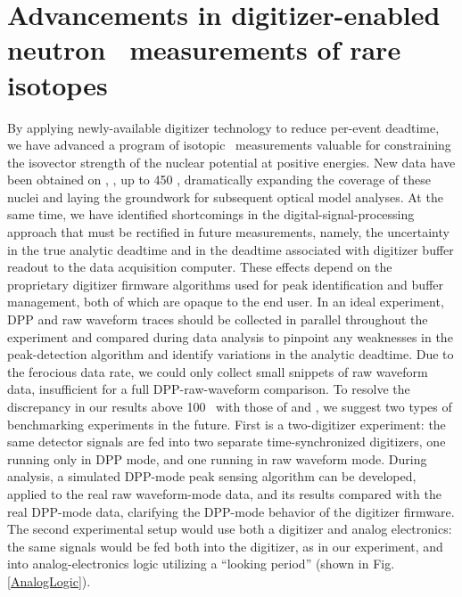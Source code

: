 \section{Advancements in digitizer-enabled neutron \tot\ measurements of rare
isotopes}
By applying newly-available digitizer technology to reduce per-event deadtime,
we have advanced a program of isotopic \tot\ 
measurements valuable for constraining the isovector strength of the nuclear potential at positive 
energies. New data have been obtained on \oEight, \niEightFour, \snTwelveFour up
to 450 \mega\electronvolt, dramatically expanding the coverage of these nuclei
and laying the groundwork for subsequent optical model analyses. At the same
time, we have identified shortcomings in the digital-signal-processing approach
that must be rectified in future measurements, namely, the uncertainty in the
true analytic deadtime and in the deadtime associated with digitizer buffer
readout to the data acquisition computer. These effects depend on
the proprietary digitizer firmware algorithms used for peak
identification and buffer management, both of which are opaque to the
end user. In an ideal experiment, DPP and raw waveform traces should be collected
in parallel throughout the experiment and compared during data analysis to
pinpoint any weaknesses in the peak-detection algorithm and identify variations in the analytic
deadtime. Due to the ferocious data rate, we could only
collect small snippets of raw waveform data, insufficient for a full
DPP-raw-waveform comparison.
To resolve the discrepancy in our results above 100
\mega\electronvolt\ with those of \cite{Finlay1993} and \cite{Abfalterer2001},
we suggest two types of benchmarking experiments in the future. First is a
two-digitizer experiment: the same detector signals are fed into two
separate time-synchronized digitizers, one running only in DPP mode,
and one running in raw waveform mode. During analysis, a simulated DPP-mode peak sensing
algorithm can be developed, applied to the real raw waveform-mode data, and its
results compared with the real DPP-mode data, clarifying the DPP-mode behavior of
the digitizer firmware. The second experimental setup would use
both a digitizer and analog electronics:
the same signals would be fed both into the digitizer, as
in our experiment, and into analog-electronics logic utilizing a ``looking
period'' (shown in Fig. \ref{AnalogLogic}).

